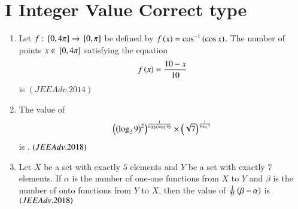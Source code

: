 \documentclass[journal,12pt,twocolumn,article]{IEEEtran}
\theoremstyle{remark}
\begin{document}
	    \section*{I Integer Value Correct type}
		   \begin{enumerate}
			   \item Let $f:{}\left[0,4\pi\right]\to{}\left[0,\pi\right]$ be defined by $f\left(x\right)=\cos^{-1}\left(\cos x\right)$. The number of points $x\in{}\left[0,4\pi\right]$ satisfying the equation 
				   \begin{align*}
					   {f\ensuremath{\left(x\right)}=\frac{10-x}{10}}
				   \end{align*}
				   is \hfill${(JEE Adv.2014)}$
			   \item The  value  of  
				   \begin{align*}
					   \left(\left(\log_29\right)^2\right)^{\frac{1}{\log_2\left(\log_29\right)}}\times \left(\sqrt7\right)^{\frac{1}{\log_47}}
				   \end{align*}
				   is .
				   \hfill${\left(JEEAdv.2018\right)}$
			   \item Let $X$ be a set with exactly $5$ elements and $Y$ be a set with exactly $7$ elements. If $\alpha$ is the number of one-one functions from $X$ to $Y$ and $\beta$ is the number of onto functions from $Y$ to $X$, then the value of $\frac{1}{5!}\left(\beta-\alpha\right)$ is ${\left(JEEAdv.2018\right)}$
		   \end{enumerate}
\end{document}
